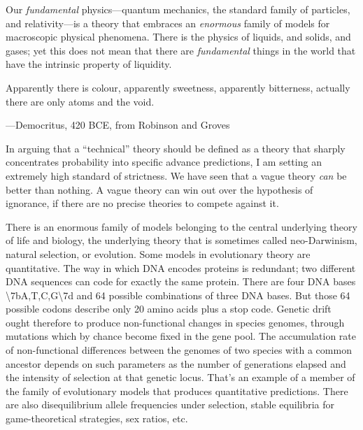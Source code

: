 {
 Our \textit{fundamental} physics---quantum mechanics, the standard
family of particles, and relativity---is a theory that embraces an
\textit{enormous} family of models for macroscopic physical phenomena.
There is the physics of liquids, and solids, and gases; yet this does
not mean that there are \textit{fundamental} things in the world that
have the intrinsic property of liquidity.}

{
 Apparently there is colour, apparently sweetness, apparently
bitterness, actually there are only atoms and the void.}

{\raggedleft
 {}---Democritus, 420 BCE, from Robinson and
Groves
\par}


\bigskip

{
 In arguing that a ``technical''
theory should be defined as a theory that sharply concentrates
probability into specific advance predictions, I am setting an
extremely high standard of strictness. We have seen that a vague theory
\textit{can} be better than nothing. A vague theory can win out over
the hypothesis of ignorance, if there are no precise theories to
compete against it.}

{
 There is an enormous family of models belonging to the central
underlying theory of life and biology, the underlying theory that is
sometimes called neo-Darwinism, natural selection, or evolution. Some
models in evolutionary theory are quantitative. The way in which DNA
encodes proteins is redundant; two different DNA sequences can code for
exactly the same protein. There are four DNA bases
{\textbackslash}{\textquotesingle}7bA,T,C,G{\textbackslash}{\textquotesingle}7d
and 64 possible combinations of three DNA bases. But those 64 possible
codons describe only 20 amino acids plus a stop code. Genetic drift
ought therefore to produce non-functional changes in species genomes,
through mutations which by chance become fixed in the gene pool. The
accumulation rate of non-functional differences between the genomes of
two species with a common ancestor depends on such parameters as the
number of generations elapsed and the intensity of selection at that
genetic locus. That's an example of a member of the
family of evolutionary models that produces quantitative predictions.
There are also disequilibrium allele frequencies under selection,
stable equilibria for game-theoretical strategies, sex ratios, etc.}

